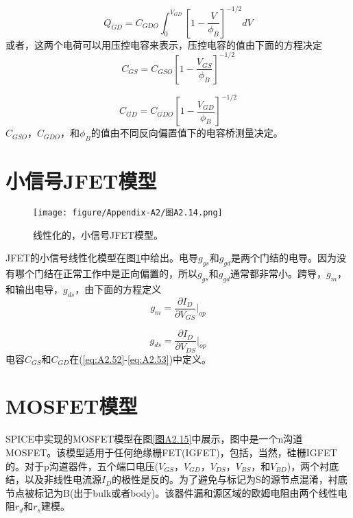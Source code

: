 \begin{equation}
    Q_{GD} = C_{GDO}\int^{V_{GD}}_0 [1-\frac{V}{\phi_B}]^{-1/2}dV
    \label{eq:A2.51}
\end{equation}
或者，这两个电荷可以用压控电容来表示，压控电容的值由下面的方程决定
\begin{equation}
    C_{GS} = C_{GSO}[1-\frac{V_{GS}}{\phi_B}]^{-1/2}
    \label{eq:A2.52}
\end{equation}

\begin{equation}
    C_{GD} = C_{GDO}[1-\frac{V_{GD}}{\phi_B}]^{-1/2}
    \label{eq:A2.53}
\end{equation}
$C_{GSO}$，$C_{GDO}$，和$\phi_B$的值由不同反向偏置值下的电容桥测量决定。

\section{小信号JFET模型}
\begin{figure}[htbp]
\small
    \centering
    \texttt{[image: figure/Appendix-A2/图A2.14.png]}
    \caption{线性化的，小信号JFET模型。}
    \label{图A2.14}
\end{figure}

JFET的小信号线性化模型在图\ref{图A2.14}中给出。电导$g_{gs}$和$g_{gd}$是两个门结的电导。因为没有哪个门结在正常工作中是正向偏置的，所以$g_{gs}$和$g_{gd}$通常都非常小。跨导，$g_m$，和输出电导，$g_{ds}$，由下面的方程定义
\begin{equation}
    g_m = \frac{\partial I_D}{\partial V_{GS}}|_{op}
    \label{eq:A2.54}
\end{equation}

\begin{equation}
    g_{ds} = \frac{\partial I_D}{\partial V_{DS}}|_{op}
    \label{eq:A2.55}
\end{equation}
电容$C_{GS}$和$C_{GD}$在(\ref{eq:A2.52}-\ref{eq:A2.53})中定义。

\section{MOSFET模型}
SPICE中实现的MOSFET模型在图\ref{图A2.15}中展示，图中是一个n沟道MOSFET。该模型适用于任何绝缘栅FET(IGFET)，包括，当然，硅栅IGFET的。对于p沟道器件，五个端口电压($V_{GS}$，$V_{GD}$，$V_{DS}$，$V_{BS}$，和$V_{BD}$)，两个衬底结，以及非线性电流源$I_D$的极性是反的。为了避免与标记为S的源节点混淆，衬底节点被标记为B(出于bulk或者body)。该器件漏和源区域的欧姆电阻由两个线性电阻$r_d$和$r_s$建模。

